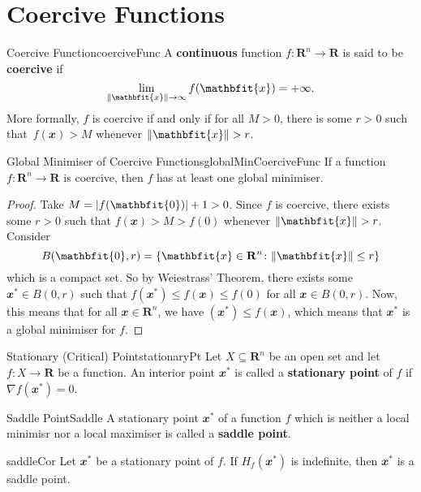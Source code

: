 \documentclass[math, code]{amznotes}
\theoremstyle{remark}
\begin{document}
\section{Coercive Functions}
\begin{dfnbox}{Coercive Function}{coerciveFunc}
    A {\color{red} \textbf{continuous}} function $f \colon \mathbf{R}^n \to \mathbf{R}$ is said to be {\color{red} \textbf{coercive}} if
    \begin{equation*}
        \lim_{\norm{\mathbfit{x}} \to \infty} f(\mathbfit{x}) = +\infty.
    \end{equation*}
    More formally, $f$ is coercive if and only if for all $M > 0$, there is some $r > 0$ such that~$f(\mathbfit{x}) > M$ whenever $\norm{\mathbfit{x}} > r$.
\end{dfnbox}
\begin{thmbox}{Global Minimiser of Coercive Functions}{globalMinCoerciveFunc}
    If a function $f \colon \mathbf{R}^n \to \mathbf{R}$ is coercive, then $f$ has at least one global minimiser.
    \tcblower   
    \begin{proof}
        Take $M = \abs{f(\mathbfit{0})} + 1 > 0$. Since $f$ is coercive, there exists some $r > 0$ such that $f(\mathbfit{x}) > M > f(\mathbfit{0})$ whenever $\norm{\mathbfit{x}} > r$. Consider
        \begin{displaymath}
            B(\mathbfit{0}, r) = \left\{\mathbfit{x} \in \mathbf{R}^n \colon \norm{\mathbfit{x}} \leq r\right\}
        \end{displaymath}
        which is a compact set. So by Weiestrass' Theorem, there exists some $\mathbfit{x}^* \in B(\mathbfit{0}, r)$ such that $f(\mathbfit{x}^*) \leq f(\mathbfit{x}) \leq f(\mathbfit{0})$ for all $\mathbfit{x} \in B(\mathbfit{0}, r)$. Now, this means that for all $\mathbfit{x} \in \mathbf{R}^n$, we have $(\mathbfit{x}^*) \leq f(\mathbfit{x})$, which means that $\mathbfit{x}^*$ is a global minimiser for $f$.
    \end{proof}
\end{thmbox}
\begin{dfnbox}{Stationary (Critical) Point}{stationaryPt}
    Let $X \subseteq \mathbf{R}^n$ be an open set and let $f \colon X \to \mathbf{R}$ be a function. An interior point $\mathbfit{x}^*$ is called a {\color{red} \textbf{stationary point}} of $f$ if $\nabla f(\mathbfit{x}^*) = \mathbfit{0}$.
\end{dfnbox}
\begin{dfnbox}{Saddle Point}{Saddle}
    A stationary point $\mathbfit{x}^*$ of a function $f$ which is neither a local minimisr nor a local maximiser is called a {\color{red} \textbf{saddle point}}.
\end{dfnbox}
\begin{corbox}{}{saddleCor}
    Let $\mathbfit{x}^*$ be a stationary point of $f$. If $H_f(\mathbfit{x}^*)$ is indefinite, then $\mathbfit{x}^*$ is a saddle point.
\end{corbox}
\end{document}
